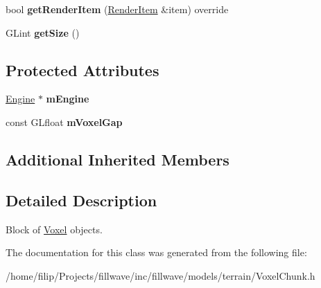 \begin{DoxyCompactItemize}
\item 
bool {\bfseries get\+Render\+Item} (\hyperlink{structflw_1_1flf_1_1RenderItem}{Render\+Item} \&item) override\hypertarget{classflw_1_1flf_1_1VoxelChunk_a17bcd385a0b401fd51f70e3db01fbb81}{}\label{classflw_1_1flf_1_1VoxelChunk_a17bcd385a0b401fd51f70e3db01fbb81}

\item 
G\+Lint {\bfseries get\+Size} ()\hypertarget{classflw_1_1flf_1_1VoxelChunk_ad6c2aaabd515bfccd852144859f58532}{}\label{classflw_1_1flf_1_1VoxelChunk_ad6c2aaabd515bfccd852144859f58532}

\end{DoxyCompactItemize}
\subsection*{Protected Attributes}
\begin{DoxyCompactItemize}
\item 
\hyperlink{classflw_1_1Engine}{Engine} $\ast$ {\bfseries m\+Engine}\hypertarget{classflw_1_1flf_1_1VoxelChunk_a28db1ba31831e301f732ecd634490724}{}\label{classflw_1_1flf_1_1VoxelChunk_a28db1ba31831e301f732ecd634490724}

\item 
const G\+Lfloat {\bfseries m\+Voxel\+Gap}\hypertarget{classflw_1_1flf_1_1VoxelChunk_a32a0b3d840f90ecd1486a8bb65a10466}{}\label{classflw_1_1flf_1_1VoxelChunk_a32a0b3d840f90ecd1486a8bb65a10466}

\end{DoxyCompactItemize}
\subsection*{Additional Inherited Members}


\subsection{Detailed Description}
Block of \hyperlink{classflw_1_1flf_1_1Voxel}{Voxel} objects. 

The documentation for this class was generated from the following file\+:\begin{DoxyCompactItemize}
\item 
/home/filip/\+Projects/fillwave/inc/fillwave/models/terrain/Voxel\+Chunk.\+h\end{DoxyCompactItemize}
